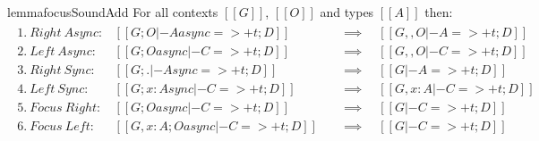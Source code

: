 \begin{restatable}{lemma}{focusSoundAdd}
  \label{lemma:fAddSynthSound}
For all contexts $[[ G ]]$, $[[ O ]]$ and types $[[ A ]]$
then:
\begin{align*}
\begin{array}{lll}
 1.\ Right\ Async: & [[ G ; O |- A async =>+ t ; D ]] \quad &\implies \quad [[ G ,, O |- A =>+ t ; D ]]\\
 2.\ Left\ Async: & [[ G ; O async |- C =>+ t ; D ]] \quad &\implies \quad [[ G ,, O |- C =>+ t ; D ]]\\
 3.\ Right\ Sync: & [[ G ; . |- A sync =>+ t ; D ]] \quad &\implies \quad [[ G |- A =>+ t ; D ]]\\
 4.\ Left\ Sync: & [[ G ; {x : A }sync |- C =>+ t ; D ]] \quad &\implies \quad [[ G, x : A |- C =>+ t ; D ]]\\
 5.\ Focus\ Right: & [[ G ; O async |- C =>+ t ; D ]] \quad &\implies \quad [[ G |- C =>+ t ; D ]]\\
 6.\ Focus\ Left: & [[ G, x : A ; O async |- C =>+ t ; D ]] \quad &\implies \quad [[ G |- C =>+ t ; D ]]
\end{array}
\end{align*}
\end{restatable}
